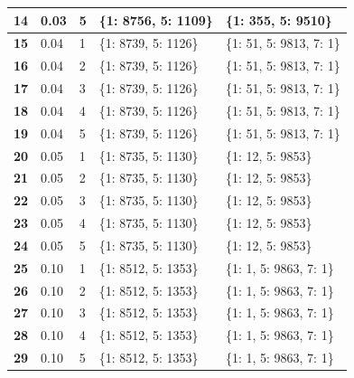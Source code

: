 \documentclass[11pt,onside]{article}
\begin{document}
\begin{table}[]
\begin{tabular}{|l|l|l|l|l|}
\textbf{14} & 0.03         & 5            & \{1: 8756, 5: 1109\}                      & \{1: 355, 5: 9510\}      \\ \hline
\textbf{15} & 0.04         & 1            & \{1: 8739, 5: 1126\}                      & \{1: 51, 5: 9813, 7: 1\} \\ \hline
\textbf{16} & 0.04         & 2            & \{1: 8739, 5: 1126\}                      & \{1: 51, 5: 9813, 7: 1\} \\ \hline
\textbf{17} & 0.04         & 3            & \{1: 8739, 5: 1126\}                      & \{1: 51, 5: 9813, 7: 1\} \\ \hline
\textbf{18} & 0.04         & 4            & \{1: 8739, 5: 1126\}                      & \{1: 51, 5: 9813, 7: 1\} \\ \hline
\textbf{19} & 0.04         & 5            & \{1: 8739, 5: 1126\}                      & \{1: 51, 5: 9813, 7: 1\} \\ \hline
\textbf{20} & 0.05         & 1            & \{1: 8735, 5: 1130\}                      & \{1: 12, 5: 9853\}       \\ \hline
\textbf{21} & 0.05         & 2            & \{1: 8735, 5: 1130\}                      & \{1: 12, 5: 9853\}       \\ \hline
\textbf{22} & 0.05         & 3            & \{1: 8735, 5: 1130\}                      & \{1: 12, 5: 9853\}       \\ \hline
\textbf{23} & 0.05         & 4            & \{1: 8735, 5: 1130\}                      & \{1: 12, 5: 9853\}       \\ \hline
\textbf{24} & 0.05         & 5            & \{1: 8735, 5: 1130\}                      & \{1: 12, 5: 9853\}       \\ \hline
\textbf{25} & 0.10         & 1            & \{1: 8512, 5: 1353\}                      & \{1: 1, 5: 9863, 7: 1\}  \\ \hline
\textbf{26} & 0.10         & 2            & \{1: 8512, 5: 1353\}                      & \{1: 1, 5: 9863, 7: 1\}  \\ \hline
\textbf{27} & 0.10         & 3            & \{1: 8512, 5: 1353\}                      & \{1: 1, 5: 9863, 7: 1\}  \\ \hline
\textbf{28} & 0.10         & 4            & \{1: 8512, 5: 1353\}                      & \{1: 1, 5: 9863, 7: 1\}  \\ \hline
\textbf{29} & 0.10         & 5            & \{1: 8512, 5: 1353\}                      & \{1: 1, 5: 9863, 7: 1\}  \\ \hline

\end{tabular}
\end{table}
\end{document}
